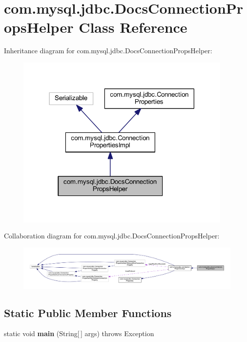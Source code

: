 \hypertarget{classcom_1_1mysql_1_1jdbc_1_1_docs_connection_props_helper}{}\section{com.\+mysql.\+jdbc.\+Docs\+Connection\+Props\+Helper Class Reference}
\label{classcom_1_1mysql_1_1jdbc_1_1_docs_connection_props_helper}


Inheritance diagram for com.\+mysql.\+jdbc.\+Docs\+Connection\+Props\+Helper\+:
\nopagebreak
\begin{figure}[H]
\begin{center}
\leavevmode
\includegraphics[width=302pt]{classcom_1_1mysql_1_1jdbc_1_1_docs_connection_props_helper__inherit__graph}
\end{center}
\end{figure}


Collaboration diagram for com.\+mysql.\+jdbc.\+Docs\+Connection\+Props\+Helper\+:
\nopagebreak
\begin{figure}[H]
\begin{center}
\leavevmode
\includegraphics[width=350pt]{classcom_1_1mysql_1_1jdbc_1_1_docs_connection_props_helper__coll__graph}
\end{center}
\end{figure}
\subsection*{Static Public Member Functions}
\begin{DoxyCompactItemize}
\item 
\mbox{\label{classcom_1_1mysql_1_1jdbc_1_1_docs_connection_props_helper_a44ae2b7cc64e641d638fc4678442df7b}} 
static void {\bfseries main} (String\mbox{[}$\,$\mbox{]} args)  throws Exception 
\end{DoxyCompactItemize}
